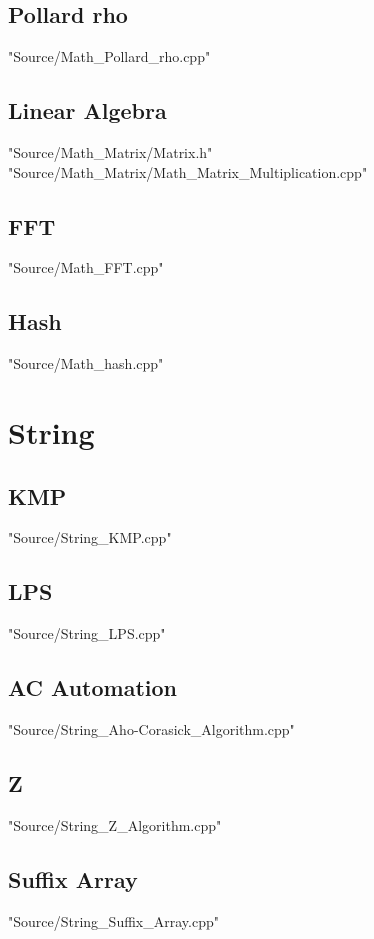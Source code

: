 \documentclass [10pt,twocolumn,oneside]{article}
\begin{document}
\subsection{Pollard rho}
 {"Source/Math_Pollard_rho.cpp"}

\subsection{Linear Algebra}
 {"Source/Math_Matrix/Matrix.h"}
 {"Source/Math_Matrix/Math_Matrix_Multiplication.cpp"}

\subsection{FFT}
 {"Source/Math_FFT.cpp"}

\subsection{Hash}
 {"Source/Math_hash.cpp"}




\newpage
\section{String}
\subsection{KMP}
 {"Source/String_KMP.cpp"}

\subsection{LPS}
 {"Source/String_LPS.cpp"}

\subsection{AC Automation}
 {"Source/String_Aho-Corasick_Algorithm.cpp"}

\subsection{Z}
 {"Source/String_Z_Algorithm.cpp"}

\subsection{Suffix Array}
 {"Source/String_Suffix_Array.cpp"}
\end{document}
